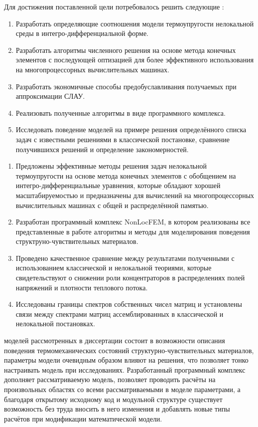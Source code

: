 Для достижения поставленной цели потребовалось решить следующие {\tasks}:
\begin{enumerate}[beginpenalty=10000] %
  \item Разработать определяющие соотношения модели термоупругости нелокальной среды в интегро-дифференциальной форме.
  \item Разработать алгоритмы численного решения на основе метода конечных элементов с последующей оптизацией для более эффективного использования на многопроцессорных вычислительных машинах.
  \item Разработать экономичные способы предобуславливания получаемых при аппроксимации СЛАУ.
  \item Реализовать полученные алгоритмы в виде программного комплекса.
  \item Исследовать поведение моделей на примере решения определённого списка задач с известными решениями в классической постановке, сравнение получившихся решений и определение закономерностей.
\end{enumerate}


{\novelty}
\begin{enumerate}[beginpenalty=10000] %
  \item Предложены эффективные методы решения задач нелокальной термоупругости на основе метода конечных элементов с обобщением на интегро-дифференциальные уравнения, которые обладают хорошей масштабируемостью и предназначены для вычислений на многопроцессорных вычислительных машинах с общей и распределённой памятью.
  \item Разработан программный комплекс NonLocFEM, в котором реализованы все представленные в работе алгоритмы и методы для моделирования поведения структруно-чувствительных материалов.
  \item Проведено качественное сравнение между результатами полученными с использованием классической и нелокальной теориями, которые свидетельствуют о снижении роли концентраторов в распределениях полей напряжений и плотности теплового потока.
  \item Исследованы границы спектров собственных чисел матриц и установлены связи между спектрами матриц ассемблированных в классической и нелокальной постановках.
\end{enumerate}

{\influence}
моделей рассмотренных в диссертации состоит в возможности описания поведения термомеханических состояний структурно-чувствительных материалов, параметры модели очевидным образом влияют на решения, что позволяет тонко настраивать модель при исследованиях. Разработанный программный комплекс дополняет рассматриваемую модель, позволяет проводить расчёты на произвольных областях со всеми рассматриваемыми в моделе параметрами, а благодаря открытому исходному код и модульной структуре существует возможность без труда вносить в него изменения и добавлять новые типы расчётов при модификации математической модели.

